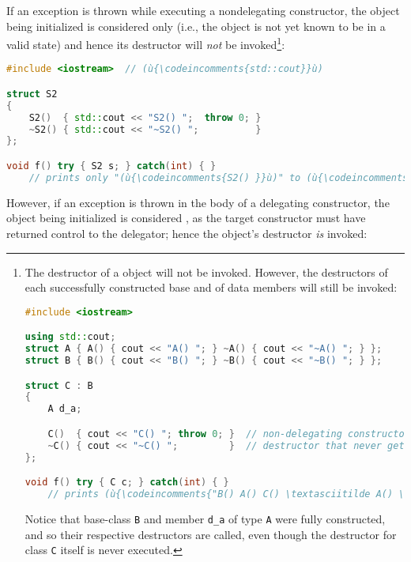\noindent If an exception is thrown while executing a nondelegating constructor,
the object being initialized is considered only  (i.e., the object is not yet known to be in a valid state)
and hence its destructor will \emph{not} be
invoked{\cprotect\footnote{The destructor of a  object will not be invoked. However, the destructors of
each successfully constructed base and of data members will still be
invoked:

\begin{lstlisting}[language=C++, basicstyle={\ttfamily\footnotesize}]
#include <iostream>

using std::cout;
struct A { A() { cout << "A() "; } ~A() { cout << "~A() "; } };
struct B { B() { cout << "B() "; } ~B() { cout << "~B() "; } };

struct C : B
{
    A d_a;

    C()  { cout << "C() "; throw 0; }  // non-delegating constructor that throws
    ~C() { cout << "~C() ";         }  // destructor that never gets called
};

void f() try { C c; } catch(int) { }
    // prints (ù{\codeincomments{"B() A() C() \textasciitilde A() \textasciitilde B()"}}ù) to (ù{\codeincomments{stdout}}ù)
\end{lstlisting}

\noindent Notice that base-class \lstinline!B! and member \lstinline!d_a! of type
\lstinline!A! were fully constructed, and so their respective destructors
are called, even though the destructor for class \lstinline!C! itself is
  never executed.}}:

\begin{lstlisting}[language=C++]
#include <iostream>  // (ù{\codeincomments{std::cout}}ù)

struct S2
{
    S2()  { std::cout << "S2() ";  throw 0; }
    ~S2() { std::cout << "~S2() ";          }
};

void f() try { S2 s; } catch(int) { }
    // prints only "(ù{\codeincomments{S2() }}ù)" to (ù{\codeincomments{stdout}}ù) (the destructor of (ù{\codeincomments{S2}}ù) is never invoked)
\end{lstlisting}

\noindent However, if an exception is thrown in the body of a delegating
constructor, the object being initialized is considered , as the target constructor must have returned control to
the delegator; hence the object's destructor \emph{is} invoked:

